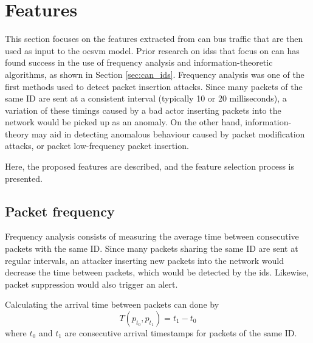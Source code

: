 
\section{Features}
\label{sec:app_features}

This section focuses on the features extracted from \gls{can} bus traffic that are then used as input to the \gls{ocsvm} model. Prior research on \glspl{ids} that focus on \gls{can} has found success in the use of frequency analysis and information-theoretic algorithms, as shown in Section \ref{sec:can_ids}. Frequency analysis was one of the first methods used to detect packet insertion attacks. Since many packets of the same ID are sent at a consistent interval (typically 10 or 20 milliseconds), a variation of these timings caused by a bad actor inserting packets into the network would be picked up as an anomaly. On the other hand, information-theory may aid in detecting anomalous behaviour caused by packet modification attacks, or packet low-frequency packet insertion.\par
Here, the proposed features are described, and the feature selection process is presented.

\subsection{Packet frequency}

Frequency analysis consists of measuring the average time between consecutive packets with the same ID. Since many packets sharing the same ID are sent at regular intervals, an attacker inserting new packets into the network would decrease the time between packets, which would be detected by the \gls{ids}. Likewise, packet suppression would also trigger an alert.\par
Calculating the arrival time between packets can done by \[T(p_{t_0}, p_{t_1}) = t_1 - t_0\] where $t_0$ and $t_1$ are consecutive arrival timestamps for packets of the same ID.

